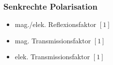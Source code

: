 

 \subsubsection{Senkrechte Polarisation}
% 


\begin{itemize}
    \item mag./elek. Reflexionsfaktor $[1]$
    \item mag. Transmissionsfaktor $[1]$
    \item elek. Transmissionsfaktor $[1]$
\end{itemize}

